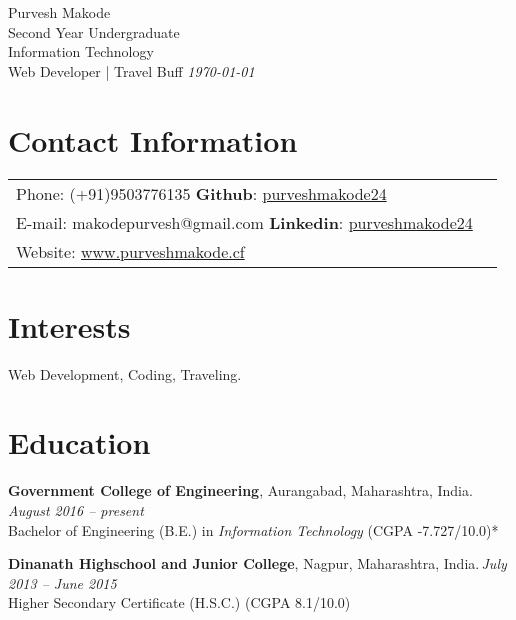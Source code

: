 \documentclass[margin,line]{res}
\begin{document}
{\Huge \ttfamily Purvesh Makode} \\
{\small Second Year Undergraduate}\\
{\small Information Technology}\\
{\small Web Developer | Travel Buff} \hspace{11cm} {\em \today}
\vspace{0.03in}
\begin{resume}
\section{\sc Contact Information}



\vspace{.08in}

\begin{tabular} {@{}p{10in}p{1in}}  
             {Phone:}  (+91)9503776135  \hspace{6cm} {\bf Github}: \href{https://github.com/PurveshMakode24}{purveshmakode24}\\
		{E-mail:}  makodepurvesh@gmail.com \hspace{4.4cm} {\bf Linkedin}: \href{https://www.linkedin.com/in/purveshmakode24/}{purveshmakode24}\\
		 {Website:} \url{www.purveshmakode.cf} 
\end{tabular}


\section{\sc Interests}

Web Development, Coding, Traveling.
\vspace{0.3cm}

\section{\sc Education}
{\bf Government College of Engineering}, Aurangabad, Maharashtra, India.\, \hfill  {\em August 2016 -- present} \\
Bachelor of Engineering (B.E.) in {\em Information Technology } \hfill(CGPA -7.727/10.0)*

{\bf Dinanath Highschool and Junior College}, Nagpur, Maharashtra, India.\,\hfill {\em July 2013 -- June 2015}\\
Higher Secondary Certificate (H.S.C.) \hfill(CGPA 8.1/10.0)
 \vspace{0.4cm}
\iffalse

\end{resume}
\end{document}
